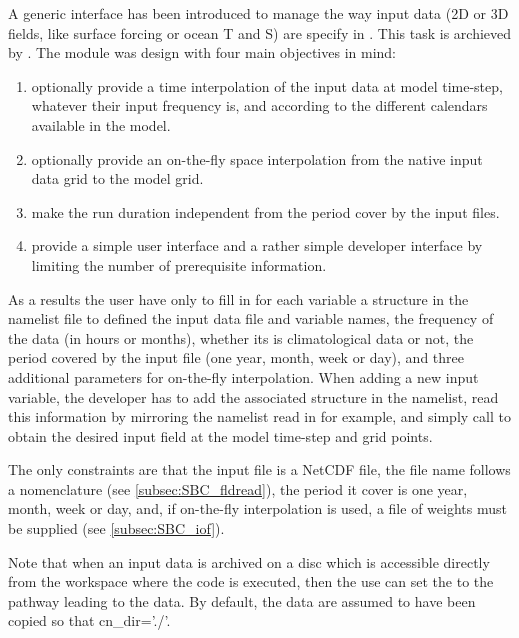 \documentclass[../tex_main/NEMO_manual]{subfiles}
\begin{document}
A generic interface has been introduced to manage the way input data (2D or 3D fields, 
like surface forcing or ocean T and S) are specify in \NEMO. This task is archieved by . 
The module was design with four main objectives in mind: 
\begin{enumerate}  
\item optionally provide a time interpolation of the input data at model time-step, 
whatever their input frequency is, and according to the different calendars available in the model.
\item optionally provide an on-the-fly space interpolation from the native input data grid to the model grid.
\item make the run duration independent from the period cover by the input files.
\item provide a simple user interface and a rather simple developer interface by limiting the 
 number of prerequisite information. 
\end{enumerate}  

As a results the user have only to fill in for each variable a structure in the namelist file 
to defined the input data file and variable names, the frequency of the data (in hours or months), 
whether its is climatological data or not, the period covered by the input file (one year, month, week or day), 
and three additional parameters for on-the-fly interpolation. When adding a new input variable, 
the developer has to add the associated structure in the namelist, read this information 
by mirroring the namelist read in  for example, and simply call  
to obtain the desired input field at the model time-step and grid points.

The only constraints are that the input file is a NetCDF file, the file name follows a nomenclature 
(see \autoref{subsec:SBC_fldread}), the period it cover is one year, month, week or day, and, if on-the-fly 
interpolation is used, a file of weights must be supplied (see \autoref{subsec:SBC_iof}).

Note that when an input data is archived on a disc which is accessible directly 
from the workspace where the code is executed, then the use can set the  
to the pathway leading to the data. By default, the data are assumed to have been 
copied so that cn\_dir='./'.

\end{document}
